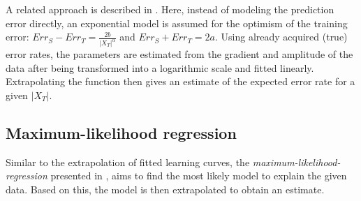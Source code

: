 A related approach is described in \cite{CortesEtal1993}. Here, instead of modeling the prediction error directly, an exponential model is assumed for the optimism of the training error: $Err_S - Err_T = \frac{2b}{|X_T|^\alpha}$ and $Err_S + Err_T = 2a$. Using already acquired (true) error rates, the parameters are estimated from the gradient and amplitude of the data after being transformed into a logarithmic scale and fitted linearly. Extrapolating the function then gives an estimate of the expected error rate for a given $|X_T|$.

\subsection{Maximum-likelihood regression}
Similar to the extrapolation of fitted learning curves, the \textit{maximum-likelihood-regression} presented in \cite{KadieEtal1995}, aims to find the most likely model to explain the given data. Based on this, the model is then extrapolated to obtain an estimate.